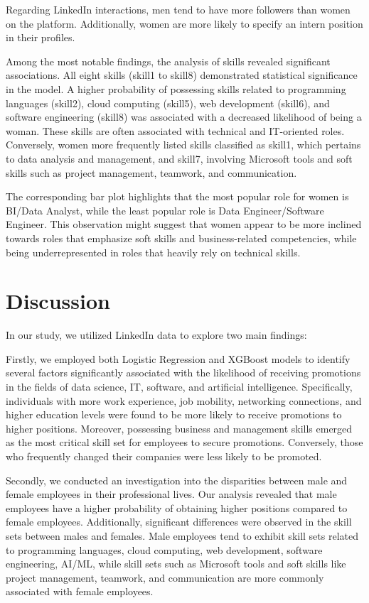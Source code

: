 \documentclass[11pt,]{article}
\begin{document}
Regarding LinkedIn interactions, men tend to have more followers than
women on the platform. Additionally, women are more likely to specify an
intern position in their profiles.

Among the most notable findings, the analysis of skills revealed
significant associations. All eight skills (skill1 to skill8)
demonstrated statistical significance in the model. A higher probability
of possessing skills related to programming languages (skill2), cloud
computing (skill5), web development (skill6), and software engineering
(skill8) was associated with a decreased likelihood of being a woman.
These skills are often associated with technical and IT-oriented roles.
Conversely, women more frequently listed skills classified as skill1,
which pertains to data analysis and management, and skill7, involving
Microsoft tools and soft skills such as project management, teamwork,
and communication.

The corresponding bar plot highlights that the most popular role for
women is BI/Data Analyst, while the least popular role is Data
Engineer/Software Engineer. This observation might suggest that women
appear to be more inclined towards roles that emphasize soft skills and
business-related competencies, while being underrepresented in roles
that heavily rely on technical skills.

\hypertarget{discussion}{%
\section{Discussion}\label{discussion}}

In our study, we utilized LinkedIn data to explore two main findings:

Firstly, we employed both Logistic Regression and XGBoost models to
identify several factors significantly associated with the likelihood of
receiving promotions in the fields of data science, IT, software, and
artificial intelligence. Specifically, individuals with more work
experience, job mobility, networking connections, and higher education
levels were found to be more likely to receive promotions to higher
positions. Moreover, possessing business and management skills emerged
as the most critical skill set for employees to secure promotions.
Conversely, those who frequently changed their companies were less
likely to be promoted.

Secondly, we conducted an investigation into the disparities between
male and female employees in their professional lives. Our analysis
revealed that male employees have a higher probability of obtaining
higher positions compared to female employees. Additionally, significant
differences were observed in the skill sets between males and females.
Male employees tend to exhibit skill sets related to programming
languages, cloud computing, web development, software engineering,
AI/ML, while skill sets such as Microsoft tools and soft skills like
project management, teamwork, and communication are more commonly
associated with female employees.
\end{document}
